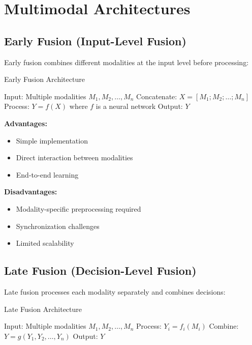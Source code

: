 \documentclass[11pt,a4paper]{article}
\begin{document}
\section{Multimodal Architectures}

\subsection{Early Fusion (Input-Level Fusion)}

Early fusion combines different modalities at the input level before processing:

\begin{algorithm}
\caption{Early Fusion Architecture}
\begin{algorithmic}[1]
\STATE Input: Multiple modalities $M_1, M_2, \ldots, M_n$
\STATE Concatenate: $X = [M_1; M_2; \ldots; M_n]$
\STATE Process: $Y = f(X)$ where $f$ is a neural network
\STATE Output: $Y$
\end{algorithmic}
\end{algorithm}

\textbf{Advantages:}
\begin{itemize}
\item Simple implementation
\item Direct interaction between modalities
\item End-to-end learning
\end{itemize}

\textbf{Disadvantages:}
\begin{itemize}
\item Modality-specific preprocessing required
\item Synchronization challenges
\item Limited scalability
\end{itemize}

\subsection{Late Fusion (Decision-Level Fusion)}

Late fusion processes each modality separately and combines decisions:

\begin{algorithm}
\caption{Late Fusion Architecture}
\begin{algorithmic}[1]
\STATE Input: Multiple modalities $M_1, M_2, \ldots, M_n$
    \STATE Process: $Y_i = f_i(M_i)$
\ENDFOR
\STATE Combine: $Y = g(Y_1, Y_2, \ldots, Y_n)$
\STATE Output: $Y$
\end{algorithmic}
\end{algorithm}
\end{document}
